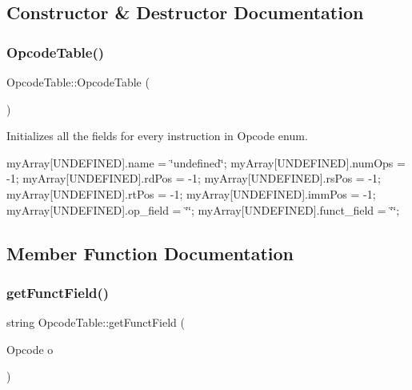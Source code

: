 \subsection{Constructor \& Destructor Documentation}
\mbox{\label{class_opcode_table_acb286fdd22f1781abfb0d820b1f345aa}} 
\subsubsection{\texorpdfstring{Opcode\+Table()}{OpcodeTable()}}
{\footnotesize\ttfamily Opcode\+Table\+::\+Opcode\+Table (\begin{DoxyParamCaption}{ }\end{DoxyParamCaption})}



Initializes all the fields for every instruction in Opcode enum. 

my\+Array\mbox{[}U\+N\+D\+E\+F\+I\+N\+ED\mbox{]}.name = \char`\"{}undefined\char`\"{}; my\+Array\mbox{[}U\+N\+D\+E\+F\+I\+N\+ED\mbox{]}.num\+Ops = -\/1; my\+Array\mbox{[}U\+N\+D\+E\+F\+I\+N\+ED\mbox{]}.rd\+Pos = -\/1; my\+Array\mbox{[}U\+N\+D\+E\+F\+I\+N\+ED\mbox{]}.rs\+Pos = -\/1; my\+Array\mbox{[}U\+N\+D\+E\+F\+I\+N\+ED\mbox{]}.rt\+Pos = -\/1; my\+Array\mbox{[}U\+N\+D\+E\+F\+I\+N\+ED\mbox{]}.imm\+Pos = -\/1; my\+Array\mbox{[}U\+N\+D\+E\+F\+I\+N\+ED\mbox{]}.op\+\_\+field = \char`\"{}\char`\"{}; my\+Array\mbox{[}U\+N\+D\+E\+F\+I\+N\+ED\mbox{]}.funct\+\_\+field = \char`\"{}\char`\"{}; 

\subsection{Member Function Documentation}
\mbox{\label{class_opcode_table_ad535fbf9bee4c19a165c94b235daed00}} 
\subsubsection{\texorpdfstring{get\+Funct\+Field()}{getFunctField()}}
{\footnotesize\ttfamily string Opcode\+Table\+::get\+Funct\+Field (\begin{DoxyParamCaption}\item[{Opcode}]{o }\end{DoxyParamCaption})}

